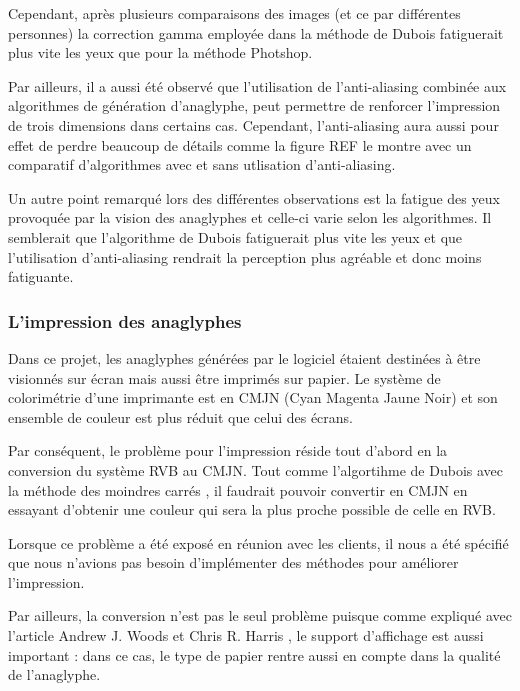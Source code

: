 Cependant, après plusieurs comparaisons des images (et ce par différentes personnes) la correction gamma employée dans la méthode de Dubois fatiguerait plus vite les yeux que pour la méthode Photshop.

Par ailleurs, il a aussi été observé que l'utilisation de l'anti-aliasing combinée aux algorithmes de génération d'anaglyphe, peut permettre de renforcer l'impression de trois dimensions dans certains cas. Cependant, l'anti-aliasing aura aussi pour effet de perdre beaucoup de détails comme la figure REF le montre avec un comparatif d'algorithmes avec et sans utlisation d'anti-aliasing. 

Un autre point remarqué lors des différentes observations est la fatigue des yeux provoquée par la vision des anaglyphes et celle-ci varie selon les algorithmes. Il semblerait que l'algorithme de Dubois fatiguerait plus vite les yeux et que l'utilisation d'anti-aliasing rendrait la perception plus agréable et donc moins fatiguante. 

\subsubsection{L'impression des anaglyphes}
Dans ce projet, les anaglyphes générées par le logiciel étaient destinées à être visionnés sur écran mais aussi être imprimés sur papier. Le système de colorimétrie d'une imprimante est en CMJN (Cyan Magenta Jaune Noir) et son ensemble de couleur est plus réduit que celui des écrans. 


Par conséquent, le problème pour l'impression réside tout d'abord en la conversion du système RVB au CMJN. Tout comme l'algortihme de Dubois avec la méthode des moindres carrés \cite{algoDubois}, il faudrait pouvoir convertir en CMJN en essayant d'obtenir une couleur qui sera la plus proche possible de celle en RVB. 

Lorsque ce problème a été exposé en réunion avec les clients, il nous a été spécifié que nous n'avions pas besoin d'implémenter des méthodes pour améliorer l'impression. 

Par ailleurs, la conversion n'est pas le seul problème puisque comme expliqué avec l'article Andrew J. Woods et Chris R. Harris \cite{anaglypheDefaut}, le support d'affichage est aussi important : dans ce cas, le type de papier rentre aussi en compte dans la qualité de l'anaglyphe. 
